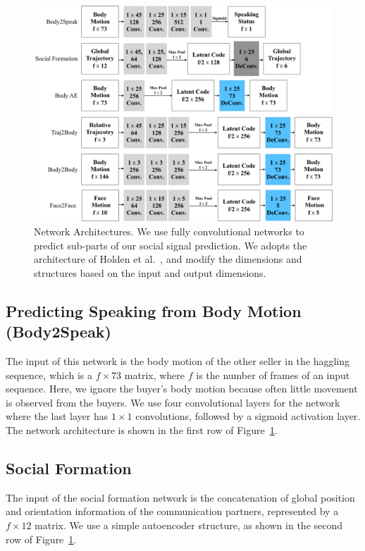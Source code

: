 \begin{figure}[t]	
	\includegraphics[width=\textwidth]{ssp_fig/networks_face}
	\caption{Network Architectures. We use fully convolutional networks to predict sub-parts of our social signal prediction. We adopts the architecture of Holden et al.~\cite{holden2016deep}, and modify the dimensions and structures based on the input and output dimensions. }
	\label{fig:architectures}
\end{figure}



\subsection{Predicting Speaking from Body Motion (Body2Speak)}
The input of this network is the body motion of the other seller in the haggling sequence, which is a $f \times 73$ matrix, where $f$ is the number of frames of an input sequence. Here, we ignore the buyer's body motion because often little movement is observed from the buyers.  We use four convolutional layers for the network where the last layer has $1\times1$ convolutions, followed by a sigmoid activation layer. The network architecture is shown in the first row of Figure~\ref{fig:architectures}.


\subsection{Social Formation}
The input of the social formation network is the concatenation of global position and orientation information of the communication partners, represented by a $f \times 12$ matrix.  We use a simple autoencoder structure, as shown in the second row of Figure~\ref{fig:architectures}.

